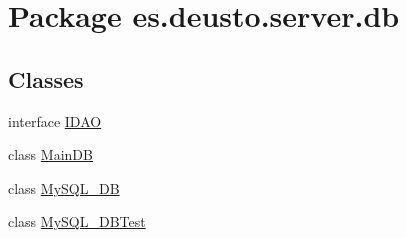 \hypertarget{namespacees_1_1deusto_1_1server_1_1db}{}\section{Package es.\+deusto.\+server.\+db}
\label{namespacees_1_1deusto_1_1server_1_1db}
\subsection*{Classes}
\begin{DoxyCompactItemize}
\item 
interface \mbox{\hyperlink{interfacees_1_1deusto_1_1server_1_1db_1_1_i_d_a_o}{I\+D\+AO}}
\item 
class \mbox{\hyperlink{classes_1_1deusto_1_1server_1_1db_1_1_main_d_b}{Main\+DB}}
\item 
class \mbox{\hyperlink{classes_1_1deusto_1_1server_1_1db_1_1_my_s_q_l___d_b}{My\+S\+Q\+L\+\_\+\+DB}}
\item 
class \mbox{\hyperlink{classes_1_1deusto_1_1server_1_1db_1_1_my_s_q_l___d_b_test}{My\+S\+Q\+L\+\_\+\+D\+B\+Test}}
\end{DoxyCompactItemize}
